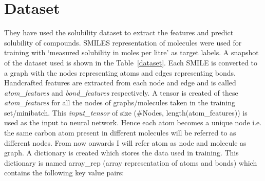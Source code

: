 \documentclass[10pt,a4paper,Times new roman]{report}
\begin{document}
\section{Dataset}
They have used the solubility dataset \citep{delaney2004esol} to extract the features and predict solubility of compounds. SMILES representation of molecules were used for training with `measured solubility in moles per litre' as target labels. A snapshot of the dataset used is shown in the Table~\ref{dataset}.
Each SMILE is converted to a graph with the nodes representing atoms and edges representing bonds. Handcrafted features are extracted from each node and edge and is called \textit{atom\_features} and \textit{bond\_features} respectively. A tensor is created of these \textit{atom\_features} for all the nodes of graphs/molecules taken in the training set/minibatch. This \textit{input\_tensor} of size (\#Nodes, length(atom\_features)) is used as the input to neural network. Hence each atom becomes a unique node i.e. the same carbon atom present in different molecules will be referred to as different nodes. From now onwards I will refer atom as node and molecule as graph. 
A dictionary is created which stores the data used in training. This dictionary is named array\_rep (array representation of atoms and bonds) which contains the following key value pairs:\\
\end{document}
